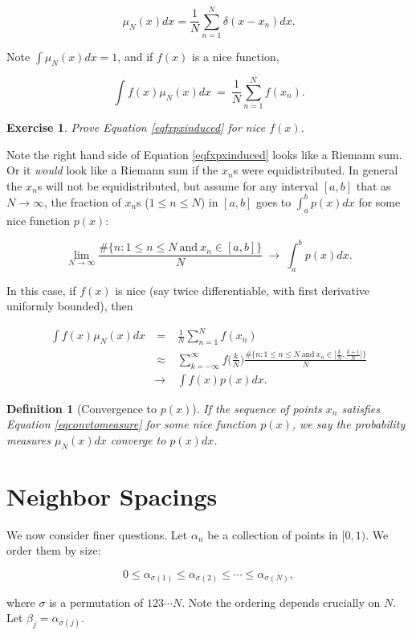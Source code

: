 \documentclass[12pt,letterpaper]{report}
\newcommand\be{\begin{equation}}
\newcommand\ee{\end{equation}}
\newcommand\bea{\begin{eqnarray}}
\newcommand\eea{\end{eqnarray}}
\newtheorem{defi}[thm]{Definition}
\newtheorem{exe}[thm]{Exercise}
\begin{document}
\be \mu_N(x)dx = \frac{1}{N} \sum_{n=1}^N \delta(x - x_n)dx. \ee

Note $\int \mu_N(x) dx = 1$, and if $f(x)$ is a nice function,

\be\label{eqfxpxinduced} \int f(x)\mu_N(x)dx \ = \
\frac{1}{N}\sum_{n=1}^N f(x_n). \ee

\begin{exe} Prove Equation \ref{eqfxpxinduced} for nice $f(x)$.
\end{exe}

Note the right hand side of Equation \ref{eqfxpxinduced} looks
like a Riemann sum. Or it \emph{would} look like a Riemann sum if
the $x_n$s were equidistributed. In general the $x_n$s will not be
equidistributed, but assume for any interval $[a,b]$ that as $N
\to \infty$, the fraction of $x_n$s ($1 \le n \le N$) in $[a,b]$
goes to $\int_a^b p(x)dx$ for some nice function $p(x)$:

\be\label{eqconvtomeasure} \lim_{N \to \infty} \frac{\# \{n: 1 \le
n \le N \ \text{and} \ x_n \in [a,b] \} }{N} \ \to \ \int_a^b
p(x)dx. \ee

In this case, if $f(x)$ is nice (say twice differentiable, with
first derivative uniformly bounded), then

\bea \int f(x)\mu_N(x)dx & \ = \ & \frac{1}{N}\sum_{n=1}^N f(x_n)
\nonumber\\ & \ \approx \ & \sum_{k=-\infty}^\infty f\Big(
\frac{k}{N} \Big) \frac{\# \{n: 1 \le n \le N \ \text{and} \ x_n
\in \Big[\frac{k}{N},\frac{k+1}{N}\Big]\} }{N} \nonumber\\ & \to \
& \int f(x) p(x)dx. \eea

\begin{defi}[Convergence to $p(x)$] If the sequence of points
$x_n$ satisfies Equation \ref{eqconvtomeasure} for some nice
function $p(x)$, we say the probability measures $\mu_N(x)dx$
converge to $p(x)dx$. \end{defi}

\section{Neighbor Spacings}

We now consider finer questions. Let $\alpha_n$ be a collection of
points in $[0,1)$. We order them by size:

\be 0 \le \alpha_{\sigma(1)} \le \alpha_{\sigma(2)} \le \cdots \le
\alpha_{\sigma(N)}, \ee

where $\sigma$ is a permutation of $123\cdots N$. Note the
ordering depends crucially on $N$. Let $\beta_j =
\alpha_{\sigma(j)}$.
\end{document}
